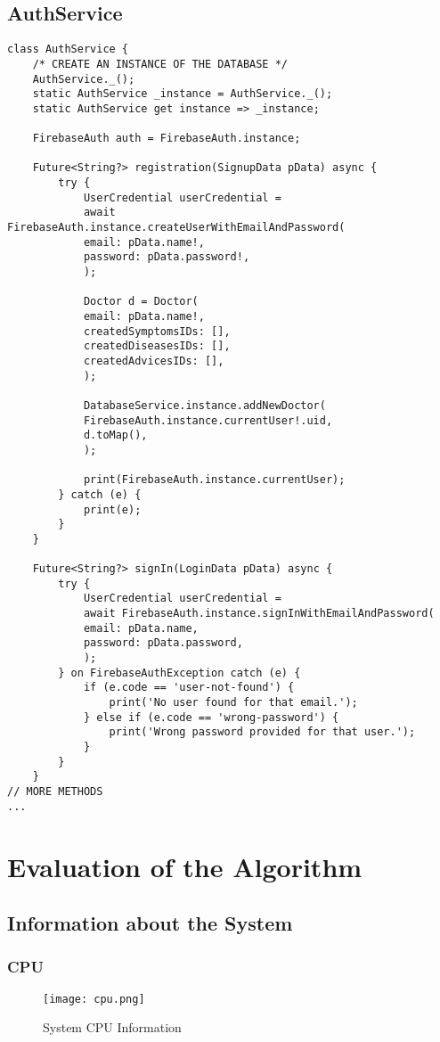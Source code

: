 \pagebreak
\tocless\section{AuthService}
\begin{lstlisting}[caption=AuthService]
class AuthService {
	/* CREATE AN INSTANCE OF THE DATABASE */
	AuthService._();
	static AuthService _instance = AuthService._();
	static AuthService get instance => _instance;
	
	FirebaseAuth auth = FirebaseAuth.instance;
	
	Future<String?> registration(SignupData pData) async {
		try {
			UserCredential userCredential =
			await FirebaseAuth.instance.createUserWithEmailAndPassword(
			email: pData.name!,
			password: pData.password!,
			);
			
			Doctor d = Doctor(
			email: pData.name!,
			createdSymptomsIDs: [],
			createdDiseasesIDs: [],
			createdAdvicesIDs: [],
			);
			
			DatabaseService.instance.addNewDoctor(
			FirebaseAuth.instance.currentUser!.uid,
			d.toMap(),
			);
			
			print(FirebaseAuth.instance.currentUser);
		} catch (e) {
			print(e);
		}
	}
	
	Future<String?> signIn(LoginData pData) async {
		try {
			UserCredential userCredential =
			await FirebaseAuth.instance.signInWithEmailAndPassword(
			email: pData.name,
			password: pData.password,
			);
		} on FirebaseAuthException catch (e) {
			if (e.code == 'user-not-found') {
				print('No user found for that email.');
			} else if (e.code == 'wrong-password') {
				print('Wrong password provided for that user.');
			}
		}
	}
// MORE METHODS
...
\end{lstlisting}
\tocless\chapter{Evaluation of the Algorithm}
\tocless\section{Information about the System}
\tocless\subsection{CPU}
\begin{figure}[H]
	\centering
	\texttt{[image: cpu.png]}
	\caption{System CPU Information}
\end{figure}
